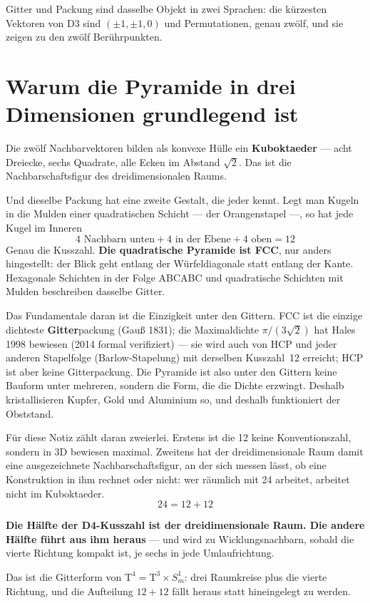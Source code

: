 Gitter und Packung sind dasselbe Objekt in zwei Sprachen: die kürzesten
Vektoren von D3 sind $(\pm1, \pm1, 0)$ und Permutationen, genau zwölf,
und sie zeigen zu den zwölf Berührpunkten.

\section{Warum die Pyramide in drei Dimensionen grundlegend ist}

Die zwölf Nachbarvektoren bilden als konvexe Hülle ein
\textbf{Kuboktaeder} --- acht Dreiecke, sechs Quadrate, alle Ecken im
Abstand $\sqrt2$. Das ist die Nachbarschaftsfigur des dreidimensionalen
Raums.

Und dieselbe Packung hat eine zweite Gestalt, die jeder kennt. Legt man
Kugeln in die Mulden einer quadratischen Schicht --- der Orangenstapel
---, so hat jede Kugel im Inneren
\[
  4 \text{ Nachbarn unten} + 4 \text{ in der Ebene}
  + 4 \text{ oben} = 12
\]
Genau die Kusszahl. \textbf{Die quadratische Pyramide ist FCC}, nur
anders hingestellt: der Blick geht entlang der Würfeldiagonale statt
entlang der Kante. Hexagonale Schichten in der Folge ABCABC und
quadratische Schichten mit Mulden beschreiben dasselbe Gitter.

Das Fundamentale daran ist die Einzigkeit unter den Gittern. FCC ist die
einzige dichteste \textbf{Gitter}packung (Gauß 1831); die Maximaldichte
$\pi/(3\sqrt2)$ hat Hales 1998 bewiesen (2014 formal verifiziert) --- sie
wird auch von HCP und jeder anderen Stapelfolge (Barlow-Stapelung) mit
derselben Kusszahl~12 erreicht; HCP ist aber keine Gitterpackung. Die
Pyramide ist also
unter den Gittern keine Bauform unter mehreren, sondern die Form, die die Dichte
erzwingt. Deshalb kristallisieren Kupfer, Gold und Aluminium so, und
deshalb funktioniert der Obststand.

Für diese Notiz zählt daran zweierlei. Erstens ist die 12 keine
Konventionszahl, sondern in 3D bewiesen maximal. Zweitens hat der
dreidimensionale Raum damit eine ausgezeichnete Nachbarschaftsfigur, an
der sich messen lässt, ob eine Konstruktion in ihm rechnet oder nicht:
wer räumlich mit 24 arbeitet, arbeitet nicht im Kuboktaeder.
\[
  24 = 12 + 12
\]

\textbf{Die Hälfte der D4-Kusszahl ist der dreidimensionale Raum. Die
andere Hälfte führt aus ihm heraus} --- und wird zu Wicklungsnachbarn,
sobald die vierte Richtung kompakt ist, je sechs in jede
Umlaufrichtung.

Das ist die Gitterform von
$\text{T}^4 = \text{T}^3 \times S^1_m$: drei Raumkreise plus die
vierte Richtung, und die Aufteilung $12 + 12$ fällt heraus statt
hineingelegt zu werden.

